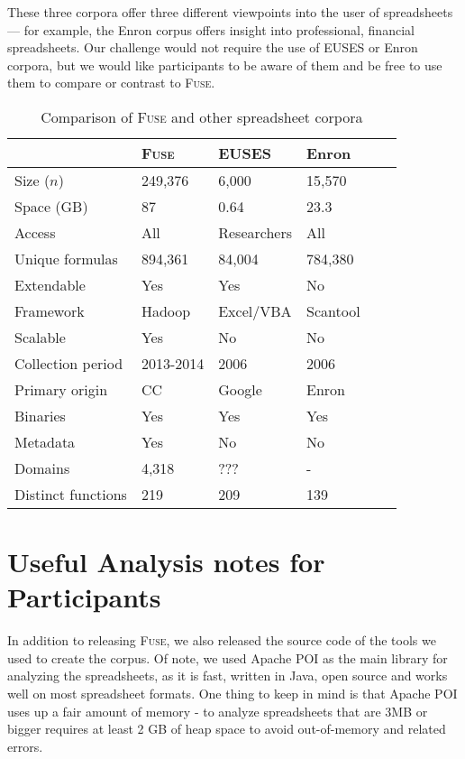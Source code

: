 \documentclass[conference]{IEEEtran}
\begin{document}
These three corpora offer three different viewpoints into the user of spreadsheets --- for example, the Enron corpus offers insight into professional, financial spreadsheets.
Our challenge would not require the use of EUSES or Enron corpora, but we would like participants to be aware of them and be free to use them to compare or contrast to \textsc{Fuse}.

\begin{table}[!t]
\caption{Comparison of \textsc{Fuse} and other spreadsheet corpora\label{tab:corpora}}
\centering
\begin{tabular}{llllll}
\toprule
 & \textbf{\textsc{Fuse}} & \textbf{EUSES} & \textbf{Enron} \\
\midrule
Size ($n$) & 249,376 & 6,000 & 15,570\\   %
Space (GB) & 87  & 0.64 & 23.3\\
Access & All & Researchers & All \\
Unique formulas & 894,361 & 84,004 & 784,380 \\
Extendable & Yes & Yes & No\\
Framework & Hadoop & Excel/VBA & Scantool \\
Scalable & Yes & No & No\\
Collection period & 2013-2014 & 2006 & 2006 \\
Primary origin & CC & Google & Enron \\
Binaries & Yes  & Yes & Yes \\
Metadata & Yes & No & No \\
Domains & 4,318 & ??? & - \\
Distinct functions & 219 & 209 & 139 \\
\bottomrule
\end{tabular}
\end{table}

\section{Useful Analysis notes for Participants}

In addition to releasing \textsc{Fuse}, we also released the source code of the tools we used to create the corpus.
Of note, we used Apache POI as the main library for analyzing the spreadsheets, as it is fast, written in Java, open source and works well on most spreadsheet formats.
One thing to keep in mind is that Apache POI uses up a fair amount of memory - to analyze spreadsheets that are 3MB or bigger requires at least 2 GB of heap space to avoid out-of-memory and related errors.
\end{document}
